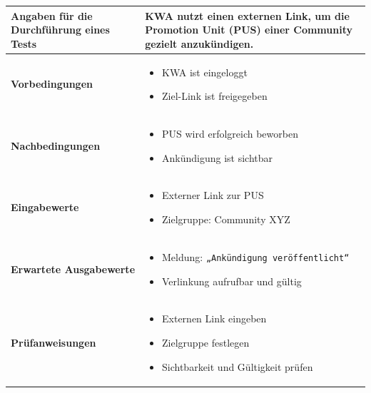 \documentclass[a4paper,12pt]{article}
\begin{document}
\begin{center}
\begin{tabular}{|p{5cm}|p{10.5cm}|}
\hline
\textbf{Angaben für die Durchführung eines Tests} & 
KWA nutzt einen externen Link, um die Promotion Unit (PUS) einer Community gezielt anzukündigen. \\
\hline
\textbf{Vorbedingungen} & 
\begin{minipage}[t]{10.5cm}
\begin{itemize}[leftmargin=*]
  \item KWA ist eingeloggt
  \item Ziel-Link ist freigegeben
\end{itemize}
\end{minipage} \\
\hline
\textbf{Nachbedingungen} & 
\begin{minipage}[t]{10.5cm}
\begin{itemize}[leftmargin=*]
  \item PUS wird erfolgreich beworben
  \item Ankündigung ist sichtbar
\end{itemize}
\end{minipage} \\
\hline
\textbf{Eingabewerte} & 
\begin{minipage}[t]{10.5cm}
\begin{itemize}[leftmargin=*]
  \item Externer Link zur PUS
  \item Zielgruppe: Community XYZ
\end{itemize}
\end{minipage} \\
\hline
\textbf{Erwartete Ausgabewerte} &
\begin{minipage}[t]{10.5cm}
\begin{itemize}[leftmargin=*]
  \item Meldung: \texttt{„Ankündigung veröffentlicht“}
  \item Verlinkung aufrufbar und gültig
\end{itemize}
\end{minipage} \\
\hline
\textbf{Prüfanweisungen} &
\begin{minipage}[t]{10.5cm}
\begin{itemize}[leftmargin=*]
  \item Externen Link eingeben
  \item Zielgruppe festlegen
  \item Sichtbarkeit und Gültigkeit prüfen
\end{itemize}
\end{minipage} \\
\hline
\end{tabular}
\end{center}
\end{document}
